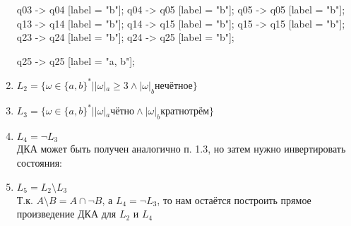 \documentclass{article}
\begin{document}
\begin{enumerate}
\begin{center}
{                q03 -> q04 [label = "b"];
                q04 -> q05 [label = "b"];
                q05 -> q05 [label = "b"];
                q13 -> q14 [label = "b"];
                q14 -> q15 [label = "b"];
                q15 -> q15 [label = "b"];
                q23 -> q24 [label = "b"];
                q24 -> q25 [label = "b"];
                
                q25 -> q25 [label = "a, b"];
        
            }
        \end{center}
        
    \begin{center}
    \end{center}
    
    \item \(L_2 = \{\omega \in\{a,b\}^* | |\omega|_a \geq 3 \wedge |\omega|_b
        {нечётное} \} \) \\
    \begin{center}
    \end{center}
    
    \item \(L_3 = \{\omega \in\{a,b\}^* | |\omega|_a {чётно} \wedge |\omega|_b
        {кратно трём} \} \) \\
    \begin{center}
    \end{center}
    
    \item \(L_4 = \neg L_3\) \\
        ДКА может быть получен аналогично п. {1.3}, но затем нужно инвертировать состояния:
    \begin{center}
    \end{center}
    
    \item \(L_5 = L_2 \setminus L_3\) \\
        Т.к. $A \setminus B = A \cap \neg B$, а $L_4 = \neg L_3$, то нам остаётся построить прямое произведение ДКА для $L_2$ и $L_4$
    \begin{center}
    \end{center}
\end{enumerate}
\end{document}
